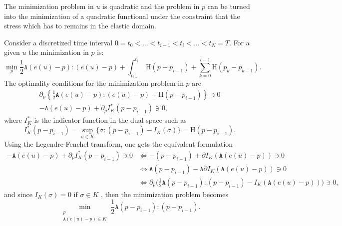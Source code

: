\documentclass[10pt,oneside]{report}
\begin{document}
The minimization problem in $u$ is quadratic and the problem in $p$ can be turned into the minimization of a quadratic functional under the constraint that the stress which has to remains in the elastic domain.

Consider a discretized time interval $0=t_0<\dots<t_{i-1}<t_i<\dots<t_N=T$.
For a given $u$ the minimization in $p$ is:
$$
    \min_{p}   \frac{1}{2} \mathtt{A} (e(u)-p) :  (e(u)-p) + \int_{t_{i-1}}^{t_i} \mathrm{H} (p-p_{i-1}) + \sum_{k=0}^{i-1} \mathrm{H} (\dot{p_k-p_{k-1}}).
$$
The optimality conditions for the minimization problem in $p$ are 
\begin{equation}
\begin{split}
\partial_p \left\{  \frac{1}{2}\mathtt{A} (e(u)-p):(e(u)-p) + \mathrm{H}(p-p_{i-1}) \right\} \ni 0 \\
-\mathtt{A} (e(u)-p) + \partial_p I^*_K(p-p_{i-1}) \ni 0,
\end{split}
\end{equation}
where $I^{*}_K$ is the indicator function in the dual space such as
$$
    I^*_K(p-p_{i-1})= \sup_{\sigma \in K} \{ \sigma:(p-p_{i-1}) - I_K(\sigma)  \} = \mathrm{H}(p-p_{i-1}).
$$
Using the Legendre-Fenchel transform, one gets the equivalent formulation 
\begin{equation}
\begin{split}
-\mathtt{A} (e(u)-p) + \partial_p I^*_K(p-p_{i-1}) \ni 0 & \Leftrightarrow -(p-p_{i-1}) + \partial I_K(\mathtt{A} (e(u)-p)) \ni 0 \\
 & \Leftrightarrow   \mathtt{A}(p-p_{i-1}) - \mathtt{A}\partial I_K (\mathtt{A}(e(u)-p)) \ni 0 \\
& \Leftrightarrow  \partial_p \Big( \frac{1}{2}\mathtt{A}(p-p_{i-1}):(p-p_{i-1}) - I_K (\mathtt{A}(e(u)-p)) \Big) \ni 0,
\end{split}
\end{equation}
and since $I_K(\sigma) = 0$ if $\sigma \in K$ , then the minimization problem becomes
$$ 
    \min_{\substack{p \\ \mathtt{A}(e(u)-p) \in K}} \frac{1}{2}\mathtt{A} (p-p_{i-1}):(p-p_{i-1}).
$$
\end{document}
